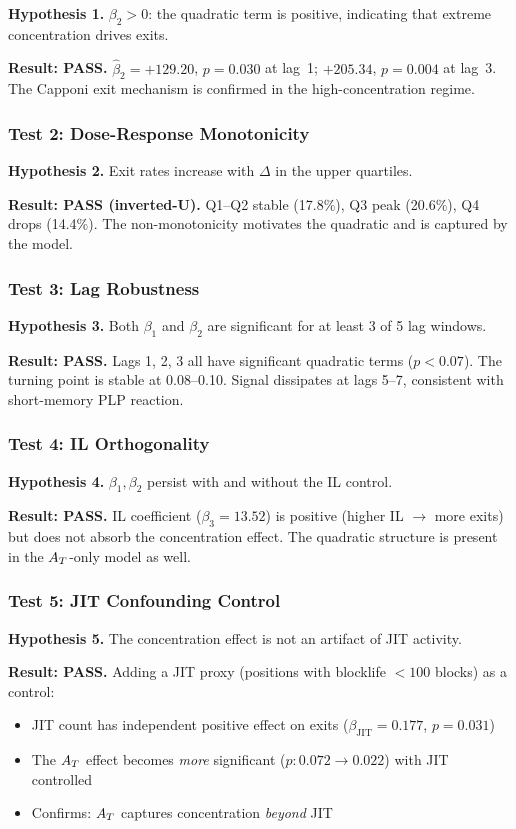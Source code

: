 \textbf{Hypothesis 1.} $\beta_2 > 0$: the quadratic term is positive,
indicating that extreme concentration drives exits.

\textbf{Result: PASS.} $\hat{\beta}_2 = +129.20$, $p = 0.030$ at lag~1;
$+205.34$, $p = 0.004$ at lag~3. The Capponi exit mechanism is confirmed in
the high-concentration regime.

\subsubsection{Test 2: Dose-Response Monotonicity}

\textbf{Hypothesis 2.} Exit rates increase with $\Delta$ in the upper
quartiles.

\textbf{Result: PASS (inverted-U).} Q1--Q2 stable (17.8\%), Q3 peak (20.6\%),
Q4 drops (14.4\%). The non-monotonicity motivates the quadratic and is
captured by the model.

\subsubsection{Test 3: Lag Robustness}

\textbf{Hypothesis 3.} Both $\beta_1$ and $\beta_2$ are significant for at
least 3 of 5 lag windows.

\textbf{Result: PASS.} Lags 1, 2, 3 all have significant quadratic terms
($p < 0.07$). The turning point is stable at 0.08--0.10. Signal dissipates at
lags 5--7, consistent with short-memory PLP reaction.

\subsubsection{Test 4: IL Orthogonality}

\textbf{Hypothesis 4.} $\beta_1, \beta_2$ persist with and without the IL
control.

\textbf{Result: PASS.} IL coefficient ($\beta_3 = 13.52$) is positive
(higher IL $\to$ more exits) but does not absorb the concentration effect.
The quadratic structure is present in the $A_T$-only model as well.

\subsubsection{Test 5: JIT Confounding Control}

\textbf{Hypothesis 5.} The concentration effect is not an artifact of JIT
activity.

\textbf{Result: PASS.} Adding a JIT proxy (positions with blocklife $< 100$
blocks) as a control:
\begin{itemize}
  \item JIT count has independent positive effect on exits
    ($\beta_{\text{JIT}} = 0.177$, $p = 0.031$)
  \item The $A_T$ effect becomes \emph{more} significant
    ($p: 0.072 \to 0.022$) with JIT controlled
  \item Confirms: $A_T$ captures concentration \emph{beyond} JIT
\end{itemize}

